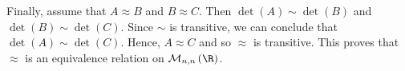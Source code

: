 \begin{enumerate}
\begin{enumerate}
Finally, assume that $A \approx B$ and $B \approx C$.  Then $\det(A) \sim \det(B)$ and 
$\det(B) \sim \det(C)$.  Since $\sim$ is transitive, we can conclude that 
$\det(A) \sim \det(C)$.  Hence, $A \approx C$ and so $\approx$ is transitive.  This proves that $\approx$ is an equivalence relation on $\mathcal{M}_{n, n}\left( \R \right)$.
\end{enumerate}

\end{enumerate}
\hbreak
\endinput
